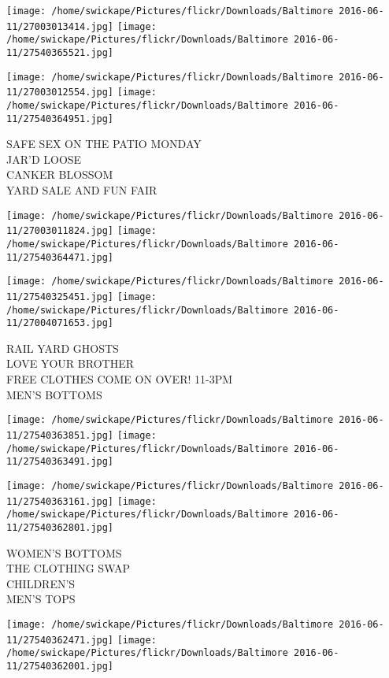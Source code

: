\documentclass[10pt,letterpaper]{article}
\begin{document}
\texttt{[image: /home/swickape/Pictures/flickr/Downloads/Baltimore 2016-06-11/27003013414.jpg]}
\texttt{[image: /home/swickape/Pictures/flickr/Downloads/Baltimore 2016-06-11/27540365521.jpg]}

\texttt{[image: /home/swickape/Pictures/flickr/Downloads/Baltimore 2016-06-11/27003012554.jpg]}
\texttt{[image: /home/swickape/Pictures/flickr/Downloads/Baltimore 2016-06-11/27540364951.jpg]}

SAFE SEX ON THE PATIO MONDAY\\
JAR'D LOOSE\\
CANKER BLOSSOM\\
YARD SALE AND FUN FAIR
\pagebreak

\texttt{[image: /home/swickape/Pictures/flickr/Downloads/Baltimore 2016-06-11/27003011824.jpg]}
\texttt{[image: /home/swickape/Pictures/flickr/Downloads/Baltimore 2016-06-11/27540364471.jpg]}

\texttt{[image: /home/swickape/Pictures/flickr/Downloads/Baltimore 2016-06-11/27540325451.jpg]}
\texttt{[image: /home/swickape/Pictures/flickr/Downloads/Baltimore 2016-06-11/27004071653.jpg]}

RAIL YARD GHOSTS\\
LOVE YOUR BROTHER\\
FREE CLOTHES COME ON OVER!  11{-}3PM\\
MEN'S BOTTOMS
\pagebreak

\texttt{[image: /home/swickape/Pictures/flickr/Downloads/Baltimore 2016-06-11/27540363851.jpg]}
\texttt{[image: /home/swickape/Pictures/flickr/Downloads/Baltimore 2016-06-11/27540363491.jpg]}

\texttt{[image: /home/swickape/Pictures/flickr/Downloads/Baltimore 2016-06-11/27540363161.jpg]}
\texttt{[image: /home/swickape/Pictures/flickr/Downloads/Baltimore 2016-06-11/27540362801.jpg]}

WOMEN'S BOTTOMS\\
THE CLOTHING SWAP\\
CHILDREN'S\\
MEN'S TOPS
\pagebreak

\texttt{[image: /home/swickape/Pictures/flickr/Downloads/Baltimore 2016-06-11/27540362471.jpg]}
\texttt{[image: /home/swickape/Pictures/flickr/Downloads/Baltimore 2016-06-11/27540362001.jpg]}
\end{document}
